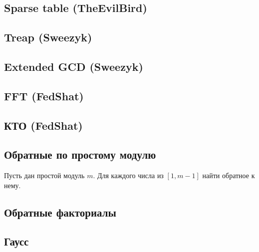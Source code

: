 \documentclass[a4paper]{article}
\begin{document}
\begin{multicols*}{2}
        \subsection{Sparse table (TheEvilBird)}
            
        
        \subsection{Treap (Sweezyk)}
            
        
        \subsection{Extended GCD (Sweezyk)}
            
        
        \subsection{FFT (FedShat)}
            
        
        \subsection{КТО (FedShat)}
            
        
        \subsection{Обратные по простому модулю}
            Пусть дан простой модуль $m$. Для каждого числа из $[1, m - 1]$ найти обратное к нему.
            
        
        \subsection{Обратные факториалы}
            
        
        \subsection{Гаусс}
            
            

\end{multicols*}
\end{document}
